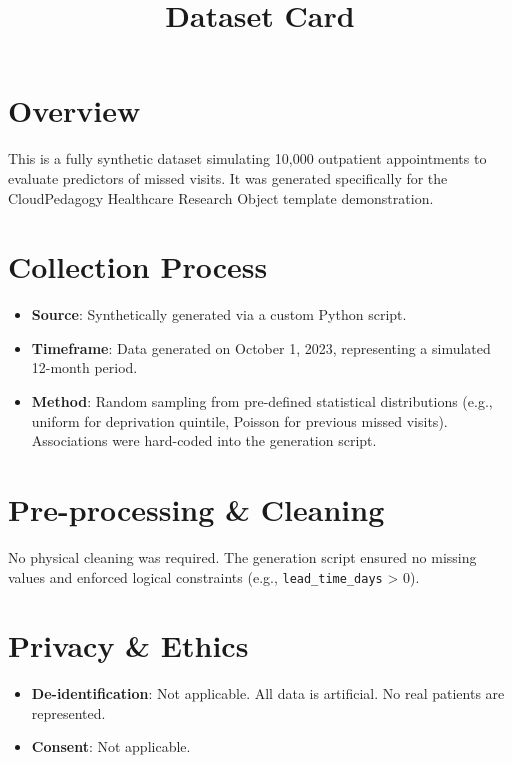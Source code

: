 \documentclass[
]{report}
\title{Dataset Card}
\author{}
\date{}
\providecommand{\tightlist}{%
  \setlength{\itemsep}{0pt}\setlength{\parskip}{0pt}}
\renewcommand*\contentsname{Table of contents}
\newcommand\contentsname{Table of contents}
\begin{document}
\maketitle

\renewcommand*\contentsname{Table of contents}
{
\hypersetup{linkcolor=}
\setcounter{tocdepth}{2}
\tableofcontents
}

\chapter{Overview}\label{overview}

This is a fully synthetic dataset simulating 10,000 outpatient
appointments to evaluate predictors of missed visits. It was generated
specifically for the CloudPedagogy Healthcare Research Object template
demonstration.

\chapter{Collection Process}\label{collection-process}

\begin{itemize}
\tightlist
\item
  \textbf{Source}: Synthetically generated via a custom Python script.
\item
  \textbf{Timeframe}: Data generated on October 1, 2023, representing a
  simulated 12-month period.
\item
  \textbf{Method}: Random sampling from pre-defined statistical
  distributions (e.g., uniform for deprivation quintile, Poisson for
  previous missed visits). Associations were hard-coded into the
  generation script.
\end{itemize}

\chapter{Pre-processing \& Cleaning}\label{pre-processing-cleaning}

No physical cleaning was required. The generation script ensured no
missing values and enforced logical constraints (e.g.,
\texttt{lead\_time\_days} \textgreater{} 0).

\chapter{Privacy \& Ethics}\label{privacy-ethics}

\begin{itemize}
\tightlist
\item
  \textbf{De-identification}: Not applicable. All data is artificial. No
  real patients are represented.
\item
  \textbf{Consent}: Not applicable.
\end{itemize}
\end{document}
